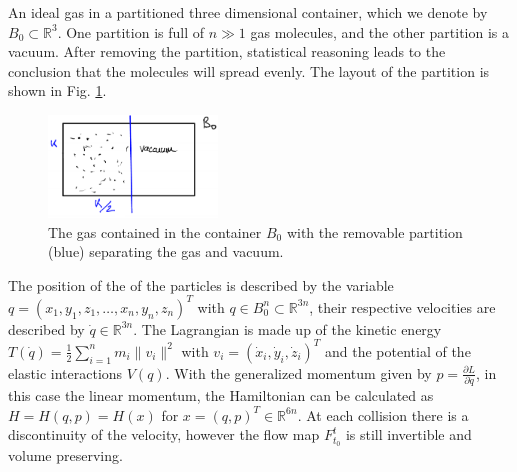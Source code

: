 \begin{ex}
	An ideal gas in a partitioned three dimensional container, which we denote by $B_0\subset \mathbb{R}^3$. One partition is full of $n \gg 1$ gas molecules, and the other partition is a vacuum. After removing the partition, statistical reasoning leads to the conclusion that the molecules will spread evenly. The layout of the partition is shown in Fig. \ref{fig:partitioned_gas}.
\begin{figure}[h!]
	\centering
	\includegraphics[width=0.4\textwidth]{figures/ch8/14partioned_container.png}
	\caption{The gas contained in the container $B_0$ with the removable partition (blue) separating the gas and vacuum.}
	\label{fig:partitioned_gas}
\end{figure}
The position of the  of the particles is described by the variable $q=(x_1, y_1, z_1, \ldots, x_n, y_n, z_n)^{T}$ with $q\in B_0^{n} \subset \mathbb{R}^{3n}$, their respective velocities are described by $\dot{q}\in \mathbb{R}^{3n}$. The Lagrangian is made up of the kinetic energy $T(\dot{q}) = \frac{1}{2}\sum_{i=1}^{n}m_i \|v_i\|^{2} $ with $v_i = (\dot{x}_i, \dot{y}_i, \dot{z}_i)^{T}$ and the potential of the elastic interactions $V(q)$. With the generalized momentum given by $p=\frac{\partial L}{\partial \dot{q}} $, in this case the linear momentum, the Hamiltonian can be calculated as $H=H(q,p)=H(x) $ for $x= (q,p)^{T}\in \mathbb{R}^{6n}$. At each collision there is a discontinuity of the velocity, however the flow map $F_{t_0}^{t}$ is still invertible and volume preserving.


\end{ex}
